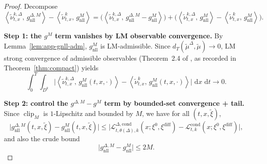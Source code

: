 \documentclass{article}
\numberwithin{equation}{section}
\theoremstyle{plain}
\theoremstyle{definition}
\theoremstyle{remark}
\newcommand{\dd}{\,\mathrm{d}}
\newcommand{\ip}[2]{\left\langle #1,\,#2 \right\rangle}
\DeclareMathOperator{\clip}{clip}
\begin{document}
\begin{proof}
Decompose
\[
\ip{\widetilde\nu^{k,\Delta}_{t,x}}{g^{\Delta,M}_{\mathrm{nll}}}
-\ip{\widetilde\nu^{k}_{t,x}}{g^{M}_{\mathrm{nll}}}
=
\Big(\ip{\widetilde\nu^{k,\Delta}_{t,x}}{g^{\Delta,M}_{\mathrm{nll}}-g^{M}_{\mathrm{nll}}}\Big)
+\Big(\ip{\widetilde\nu^{k,\Delta}_{t,x}}{g^{M}_{\mathrm{nll}}}-\ip{\widetilde\nu^{k}_{t,x}}{g^{M}_{\mathrm{nll}}}\Big).
\]

\smallskip
\noindent\textbf{Step 1: the $g^M$ term vanishes by LM observable convergence.}
By Lemma~\ref{lem:app-gnll-adm}, $g^M_{\mathrm{nll}}$ is LM-admissible. Since
$d_T(\widetilde\mu^\Delta,\widetilde\mu)\to0$, LM strong convergence of admissible observables
(Theorem~2.4 of \cite{LMP2021}, as recorded in Theorem~\ref{thm:compact}) yields
\[
\int_0^T\!\!\int_{D^k}
\Big|
\ip{\widetilde\nu^{k,\Delta}_{t,x}}{g^{M}_{\mathrm{nll}}(t,x,\cdot)}
-
\ip{\widetilde\nu^{k}_{t,x}}{g^{M}_{\mathrm{nll}}(t,x,\cdot)}
\Big|\,\dd x\,\dd t \longrightarrow 0.
\]

\smallskip
\noindent\textbf{Step 2: control the $g^{\Delta,M}-g^M$ term by bounded-set convergence + tail.}
Since $\clip_M$ is $1$-Lipschitz and bounded by $M$, we have for all $(t,x,\widetilde\xi)$,
\[
\big|g^{\Delta,M}_{\mathrm{nll}}(t,x,\widetilde\xi)-g^{M}_{\mathrm{nll}}(t,x,\widetilde\xi)\big|
\le
\big|\mathcal L^{\Delta,\mathrm{cond}}_{t,\theta(\Delta),k}(x;\xi^0,\xi^{\mathrm{diff}})
-\mathcal L^{\mathrm{cond}}_{t,k}(x;\xi^0,\xi^{\mathrm{diff}})\big|,
\]
and also the crude bound
\[
\big|g^{\Delta,M}_{\mathrm{nll}}-g^{M}_{\mathrm{nll}}\big|\le 2M.
\]


\end{proof}
\end{document}
